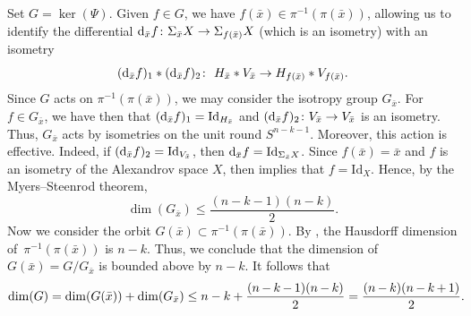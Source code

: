 \documentclass[pdftex]{sigma}
\numberwithin{equation}{section}
\theoremstyle{definition}
\begin{document}
Set $G = \ker(\Psi)$. Given $f\in G$, we have $f(\bar{x})\in \pi^{-1}(\pi(\bar{x}))$, allowing us to identify the differential ${\rm d}_{\bar{x}} f \colon \Sigma_{\bar{x}} X\to \Sigma_{f(\bar{x})} X$ (which is an isometry) with an isometry
\[
({\rm d}_{\bar{x}}f)_1 * ({\rm d}_{\bar{x}}f)_2\colon\ H_{\bar{x}}* V_{\bar{x}}\to H_{f(\bar{x})}* V_{f(\bar{x})}.
\]
Since $G$ acts on $\pi^{-1}(\pi(\bar{x}))$, we may consider the isotropy group $G_{\bar{x}}$.
For $f\in G_{\bar{x}}$, we have then that $({\rm d}_{\bar{x}}f)_1=\mathrm{Id}_{H_{\bar{x}}}$ and $({\rm d}_{\bar{x}}f)_2\colon V_{\bar{x}}\to V_{\bar{x}}$ is an isometry.
Thus, $G_{\bar{x}}$ acts by isometries on the unit round $S^{n-k-1}$.
Moreover, this action is effective.
Indeed, if $({\rm d}_{\bar{x}}f)_2 =\mathrm{Id}_{V_{\bar{x}}}$, then ${\rm d}_{\bar{x}}f = \mathrm{Id}_{\Sigma_{\bar{x}} X}$.
Since $f(\bar{x}) = \bar{x}$ and $f$ is an isometry of the Alexandrov space $X$, then \cite[Lemma~3.2]{GalazGarciaGuijarro2013} implies that $f=\mathrm{Id}_X$.
Hence, by the Myers--Steenrod theorem,
\[
 \dim (G_{\bar{x}})\leq \frac{(n-k-1)(n-k)}{2}.
\]
Now we consider the orbit $G(\bar{x})\subset \pi^{-1}(\pi(\bar{x}))$.
By \cite[Korollar 7.5]{Lytchak}, the Hausdorff dimension of~$\pi^{-1}(\pi(\bar{x}))$ is $n-k$.
Thus, we conclude that the dimension of $G(\bar{x})= G/G_{\bar{x}}$ is bounded above by $n-k$. It follows that
\begin{align}
\dim(G)= \dim(G(\bar{x}))+\dim(G_{\bar{x}}) \leq n-k+\frac{(n\hspace{-0.5pt}-\hspace{-0.5pt}k\hspace{-0.5pt}-\hspace{-0.5pt}1)(n\hspace{-0.5pt}-\hspace{-0.5pt}k)}{2}
= \frac{(n\hspace{-0.5pt}-\hspace{-0.5pt}k)(n\hspace{-0.5pt}-\hspace{-0.5pt}k\hspace{-0.5pt}+\hspace{-0.5pt}1)}{2}.\!\!\!\!\label{eq:bound.alex.1}
\end{align}
\end{document}
